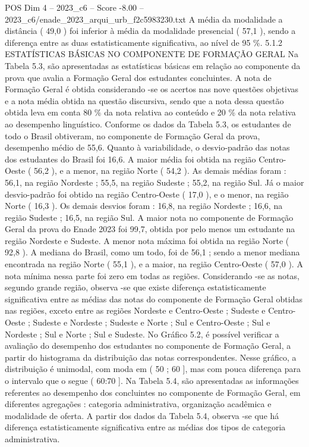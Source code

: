 \begin{textsample}{POS Dim 4 – 2023\_c6 – Score -8.00 – 2023\_c6/enade\_2023\_arqui\_urb\_f2c5983230.txt}
A média da modalidade a distância ( 49,0 ) foi inferior à média da modalidade presencial ( 57,1 ), sendo a diferença entre as duas estatisticamente significativa, ao nível de 95 \%. 5.1.2 ESTATÍSTICAS BÁSICAS NO COMPONENTE DE FORMAÇÃO GERAL Na Tabela 5.3, são apresentadas as estatísticas básicas em relação ao componente da prova que avalia a Formação Geral dos estudantes concluintes.
A nota de Formação Geral é obtida considerando -se os acertos nas nove questões objetivas e a nota média obtida na questão discursiva, sendo que a nota dessa questão obtida leva em conta 80 \% da nota relativa ao conteúdo e 20 \% da nota relativa ao desempenho linguístico.
Conforme os dados da Tabela 5.3, os estudantes de todo o Brasil obtiveram, no componente de Formação Geral da prova, desempenho médio de 55,6.
Quanto à variabilidade, o desvio-padrão das notas dos estudantes do Brasil foi 16,6.
A maior média foi obtida na região Centro-Oeste ( 56,2 ), e a menor, na região Norte ( 54,2 ).
As demais médias foram : 56,1, na região Nordeste ; 55,5, na região Sudeste ; 55,2, na região Sul.
Já o maior desvio-padrão foi obtido na região Centro-Oeste ( 17,0 ), e o menor, na região Norte ( 16,3 ).
Os demais desvios foram : 16,8, na região Nordeste ; 16,6, na região Sudeste ; 16,5, na região Sul.
A maior nota no componente de Formação Geral da prova do Enade 2023 foi 99,7, obtida por pelo menos um estudante na região Nordeste e Sudeste.
A menor nota máxima foi obtida na região Norte ( 92,8 ).
A mediana do Brasil, como um todo, foi de 56,1 ; sendo a menor mediana encontrada na região Norte ( 55,1 ), e a maior, na região Centro-Oeste ( 57,0 ).
A nota mínima nessa parte foi zero em todas as regiões.
Considerando -se as notas, segundo grande região, observa -se que existe diferença estatisticamente significativa entre as médias das notas do componente de Formação Geral obtidas nas regiões, exceto entre as regiões Nordeste e Centro-Oeste ; Sudeste e Centro-Oeste ; Sudeste e Nordeste ; Sudeste e Norte ; Sul e Centro-Oeste ; Sul e Nordeste ; Sul e Norte ; Sul e Sudeste.
No Gráfico 5.2, é possível verificar a avaliação do desempenho dos estudantes no componente de Formação Geral, a partir do histograma da distribuição das notas correspondentes.
Nesse gráfico, a distribuição é unimodal, com moda em ( 50 ; 60 ], mas com pouca diferença para o intervalo que o segue ( 60:70 ].
Na Tabela 5.4, são apresentadas as informações referentes ao desempenho dos concluintes no componente de Formação Geral, em diferentes agregações : categoria administrativa, organização acadêmica e modalidade de oferta.
A partir dos dados da Tabela 5.4, observa -se que há diferença estatisticamente significativa entre as médias dos tipos de categoria administrativa.

\end{textsample}

